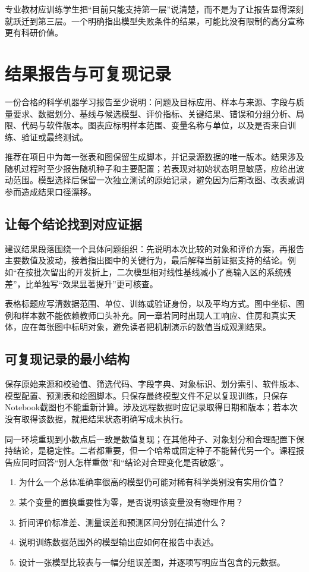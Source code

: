专业教材应训练学生把“目前只能支持第一层”说清楚，而不是为了让报告显得深刻就跃迁到第三层。一个明确指出模型失败条件的结果，可能比没有限制的高分宣称更有科研价值。

\section{结果报告与可复现记录}
一份合格的科学机器学习报告至少说明：问题及目标应用、样本与来源、字段与质量要求、数据划分、基线与候选模型、评价指标、关键结果、错误和分组分析、局限、代码与软件版本。图表应标明样本范围、变量名称与单位，以及是否来自训练、验证或最终测试。

推荐在项目中为每一张表和图保留生成脚本，并记录源数据的唯一版本。结果涉及随机过程时至少报告随机种子和主要配置；若表现对初始状态明显敏感，应给出波动范围。模型选择后保留一次独立测试的原始记录，避免因为后期改图、改表或调参而造成结果口径漂移。

\subsection{让每个结论找到对应证据}
建议结果段落围绕一个具体问题组织：先说明本次比较的对象和评价方案，再报告主要数值及波动，接着指出图中的关键行为，最后解释当前证据支持的结论。例如“在按批次留出的开发折上，二次模型相对线性基线减小了高输入区的系统残差”，比单独写“效果显著提升”更可核查。

表格标题应写清数据范围、单位、训练或验证身份，以及平均方式。图中坐标、图例和样本数不能依赖教师口头补充。同一章若同时出现人工响应、住房和真实天体，应在每张图中标明对象，避免读者把机制演示的数值当成观测结果。

\subsection{可复现记录的最小结构}
保存原始来源和校验值、筛选代码、字段字典、对象标识、划分索引、软件版本、模型配置、预测表和绘图脚本。只保存最终模型文件不足以复现训练，只保存Notebook截图也不能重新计算。涉及远程数据时应记录取得日期和版本；若本次没有取得该数据，就把结果状态明确写成未执行。

同一环境重现到小数点后一致是数值复现；在其他种子、对象划分和合理配置下保持结论，是稳定性。二者都重要，但一个哈希或固定种子不能替代另一个。课程报告应同时回答“别人怎样重做”和“结论对合理变化是否敏感”。

\chapterexercise
\begin{enumerate}
\item 为什么一个总体准确率很高的模型仍可能对稀有科学类别没有实用价值？
\item 某个变量的置换重要性为零，是否说明该变量没有物理作用？
\item 折间评价标准差、测量误差和预测区间分别在描述什么？
\item 说明训练数据范围外的模型输出应如何在报告中表述。
\item 设计一张模型比较表与一幅分组误差图，并逐项写明应当包含的元数据。
\end{enumerate}

